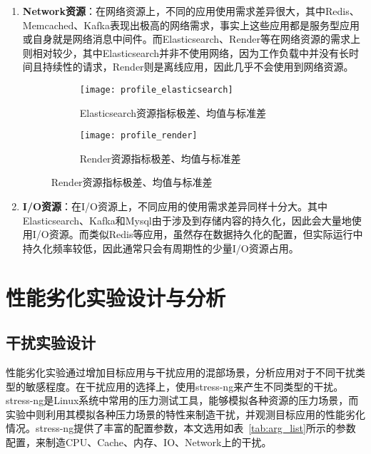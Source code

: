 \begin{enumerate}
    \item \textbf{Network资源}：在网络资源上，不同的应用使用需求差异很大，其中Redis、Memcached、Kafka表现出极高的网络需求，事实上这些应用都是服务型应用或自身就是网络消息中间件。而Elasticsearch、Render等在网络资源的需求上则相对较少，其中Elasticsearch并非不使用网络，因为工作负载中并没有长时间且持续性的请求，Render则是离线应用，因此几乎不会使用到网络资源。

\begin{figure}[H]
    \centering
    \begin{subfigure}[b]{0.85\textwidth}
      \texttt{[image: profile\_elasticsearch]}
      \caption{Elasticsearch资源指标极差、均值与标准差}
      \label{fig:profile_elasticsearch}
    \end{subfigure}
    \begin{subfigure}[b]{0.85\textwidth}
        \texttt{[image: profile\_render]}
        \caption{Render资源指标极差、均值与标准差}
        \label{fig:profile_render}
    \end{subfigure}
\label{fig:resource_affinity_2}
\end{figure}
    
    \item \textbf{I/O资源}：在I/O资源上，不同应用的使用需求差异同样十分大。其中Elasticsearch、Kafka和Mysql由于涉及到存储内容的持久化，因此会大量地使用I/O资源。而类似Redis等应用，虽然存在数据持久化的配置，但实际运行中持久化频率较低，因此通常只会有周期性的少量I/O资源占用。

\end{enumerate}

\section{性能劣化实验设计与分析}

\subsection{干扰实验设计}


性能劣化实验通过增加目标应用与干扰应用的混部场景，分析应用对于不同干扰类型的敏感程度。在干扰应用的选择上，使用stress-ng来产生不同类型的干扰。stress-ng是Linux系统中常用的压力测试工具，能够模拟各种资源的压力场景，而实验中则利用其模拟各种压力场景的特性来制造干扰，并观测目标应用的性能劣化情况。stress-ng提供了丰富的配置参数，本文选用如表~\ref{tab:arg_list}所示的参数配置，来制造CPU、Cache、内存、IO、Network上的干扰。

